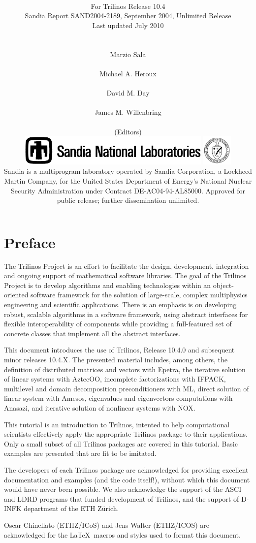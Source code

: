 \documentclass[final]{colabarticle}
\title{\textbf{\resizebox{10cm}{!}{Trilinos Tutorial}}\vspace{5mm}}
\subtitle{
  \\
  \vspace*{4mm}
  \Large For Trilinos Release 10.4 \\
  \vspace*{5mm}
  \noindent
  Sandia Report SAND2004-2189,
  September 2004,
  Unlimited Release \\
  \vspace*{5mm}
  \noindent
  Last updated July 2010 \\
\vspace{6cm}\\
\\ \vspace{0mm}
\hspace*{1cm} Marzio Sala \\
\\ \vspace{0mm}
\hspace*{1cm} Michael A. Heroux\\
\\ \vspace{0mm}
\hspace*{1cm} David M. Day\\
\\ \vspace{0mm}
\hspace*{1cm} James M. Willenbring\\
\\ \vspace{0mm}
\hspace*{1cm} \normalsize (Editors) \\
\vspace*{1cm}
\vfill
\includegraphics[height=1.5cm]{snllineblk}  \hfill
\includegraphics[height=1.5cm]{DOEbwlogo}  \\
Sandia is a multiprogram laboratory operated by Sandia Corporation,
a Lockheed Martin Company, for the United States Department of Energy's
National Nuclear Security Administration under Contract DE-AC04-94-AL85000.
Approved for public release; further dissemination unlimited.
}
\newcommand{\Trilinos}{Trilinos}
\begin{document}
\maketitle

\chapter*{Preface}
  The Trilinos Project is an effort to facilitate the design,
  development, integration and ongoing support of mathematical software
  libraries.  The goal of the Trilinos Project is to develop algorithms
  and enabling technologies within an object-oriented software
  framework for the solution of large-scale, complex multiphysics
  engineering and scientific applications. There is an emphasis is on 
  developing robust, scalable algorithms in a software framework, using
  abstract interfaces for flexible interoperability of components while
  providing a full-featured set of concrete classes that implement all
  the abstract interfaces.

  \medskip

  This document introduces the use of \Trilinos{}, Release 10.4.0 and
  subsequent minor releases 10.4.X.  The
  presented material includes, among others, the definition of
  distributed matrices and vectors with Epetra, the iterative solution
  of linear systems with AztecOO, incomplete factorizations with IFPACK,
  multilevel and domain decomposition preconditioners with ML, direct
  solution of linear system with Amesos,
  eigenvalues and eigenvectors computations with Anasazi,
  and iterative solution of nonlinear systems with NOX.

  This tutorial is an introduction to Trilinos, intented to help
  computational scientists effectively apply the appropriate Trilinos
  package to their applications. Only a small subset of all Trilinos 
  packages are covered in this tutorial. Basic examples are presented
  that are fit to be imitated.

  \bigskip

  The developers of each Trilinos package are acknowledged for providing
  excellent documentation and examples (and the code itself!),
  without which this document would have never been possible.  We also
  acknowledge the support of the ASCI and LDRD programs that funded
  development of Trilinos, and the support of D-INFK department of the ETH
  Z\"urich.

  \smallskip

  Oscar Chinellato (ETHZ/ICoS) and Jens Walter (ETHZ/ICOS) are acknowledged
  for the \LaTeX\ macros and styles used to format this document.
\end{document}
